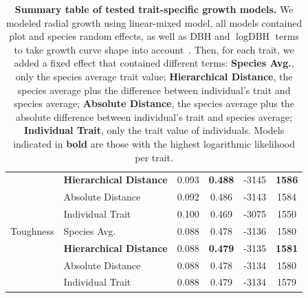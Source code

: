 \begin{table}[!t]
\begin{center}
\begin{tabular}{llcccc}
		                  & \textbf{Hierarchical Distance} & 0.093 & \textbf{0.488} & -3145 & \textbf{1586} \\ 
		                  & Absolute Distance & 0.092 & 0.486 & -3143 & 1584 \\ 
		                  & Individual Trait & 0.100 & 0.469 & -3075 & 1550 \\ 
		  Toughness & Species Avg. & 0.088 & 0.478 & -3136 & 1580 \\ 
		            & \textbf{Hierarchical Distance} & 0.088 & \textbf{0.479} & -3135 & \textbf{1581} \\ 
		            & Absolute Distance & 0.088 & 0.478 & -3134 & 1580 \\ 
		            & Individual Trait & 0.088 & 0.479 & -3134 & 1579 \\ 
		   \hline
		   \hline
		\end{tabular}
		\caption{\textbf{Summary table of tested trait-specific growth models.} We modeled radial growth using linear-mixed model, all models contained plot and species random effects, as well as DBH and $\log\text{DBH}$ terms to take growth curve shape into account~\citep{herault_functional_2011}. Then, for each trait, we added a fixed effect that contained different terms: \textbf{Species Avg.}, only the species average trait value; \textbf{Hierarchical Distance}, the species average plus the difference between individual's trait and species average; \textbf{Absolute Distance}, the species average plus the absolute difference between individual's trait and species average; \textbf{Individual Trait}, only the trait value of individuals. Models indicated in \textbf{bold} are those with the highest logarithmic likelihood per trait.}
		\label{tab:growth_mod}
	\end{center}
\end{table}

